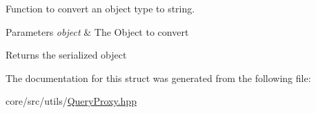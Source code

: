 Function to convert an object type to string. 


\begin{DoxyParams}{Parameters}
{\em object} & The Object to convert \\
\hline
\end{DoxyParams}
\begin{DoxyReturn}{Returns}
the serialized object 
\end{DoxyReturn}


The documentation for this struct was generated from the following file:\begin{DoxyCompactItemize}
\item 
core/src/utils/\hyperlink{QueryProxy_8hpp}{QueryProxy.hpp}\end{DoxyCompactItemize}
